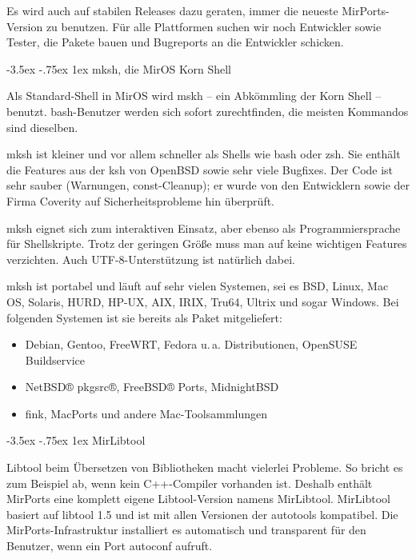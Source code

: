 \documentclass[a4paper,landscape,11pt,notumble]{leaflet}
\makeatletter
\newcommand{\sectbox}[1]{%
 \noindent\protect\colorbox{yellow}{%
 \@tempdima=\hsize
 \advance\@tempdima by-2\fboxsep
 \advance\@tempdima by-2\fboxrule
 \protect\parbox{\@tempdima}{%
 \medskip
 \raggedright %
 #1 \medskip
}}}
\renewcommand\section{\@startsection{section}{1}{0.9em}%
  {-3.5ex \@plus -.75ex}%
  {1ex} %
  {\normalfont\Large\itshape\sectbox}}
\makeatother
\begin{document}
Es wird auch auf stabilen Releases dazu geraten, immer die neueste MirPorts-Version zu benutzen. Für alle Plattformen suchen wir noch Entwickler sowie Tester, die Pakete bauen und Bugreports an die Entwickler schicken.

\newpage

\section{mksh, die MirOS Korn Shell}

Als Standard-Shell in MirOS wird mskh -- ein Abkömmling der Korn Shell -- benutzt. bash-Benutzer werden sich sofort zurechtfinden, die meisten Kommandos sind dieselben.

mksh ist kleiner und vor allem schneller als Shells wie bash oder zsh. Sie enthält die Features aus der ksh von OpenBSD sowie sehr viele Bugfixes. Der Code ist sehr sauber (Warnungen, const-Cleanup); er wurde von den Entwicklern sowie der Firma Coverity auf Sicherheitsprobleme hin überprüft.

mksh eignet sich zum interaktiven Einsatz, aber ebenso als Programmiersprache für Shellskripte. Trotz der geringen Größe muss man auf keine wichtigen Features verzichten. Auch UTF-8-Unterstützung ist natürlich dabei.

mksh ist portabel und läuft auf sehr vielen Systemen, sei es BSD, Linux, Mac OS, Solaris, HURD, HP-UX, AIX, IRIX, Tru64, Ultrix und sogar Windows. Bei folgenden Systemen ist sie bereits als Paket mitgeliefert:

\begin{itemize}
\item Debian, Gentoo, FreeWRT, Fedora u.\,a. Distributionen, OpenSUSE Buildservice
\item NetBSD® pkgsrc®, FreeBSD® Ports, MidnightBSD
\item fink, MacPorts und andere Mac-Toolsammlungen
\end{itemize}

\section{MirLibtool}

Libtool beim Übersetzen von Bibliotheken macht vielerlei Probleme. So bricht es zum Beispiel ab, wenn kein C++-Compiler vorhanden ist. Deshalb enthält MirPorts eine komplett eigene Libtool-Version namens MirLibtool.
MirLibtool basiert auf libtool 1.5 und ist mit allen Versionen der autotools kompatibel. Die MirPorts-Infrastruktur installiert es automatisch und transparent für den Benutzer, wenn ein Port autoconf aufruft.
\end{document}
